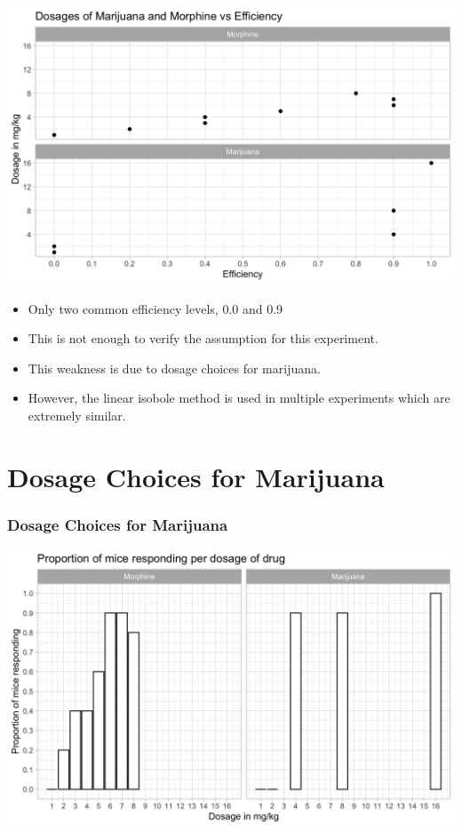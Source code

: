 \documentclass[14pt]{beamer}
\begin{document}
\begin{frame}
\includegraphics[scale=0.22]{dos_vs_eff.png}
\end{frame}

\begin{frame}
\begin{itemize}[label={$\blacktriangleright$}]
\item Only two common efficiency levels, 0.0 and 0.9
\item This is not enough to verify the assumption for this experiment.
\item This weakness is due to dosage choices for marijuana.
\item However, the linear isobole method is used in multiple experiments which are extremely similar.
\end{itemize}
\end{frame}

\section{Dosage Choices for Marijuana}

\begin{frame}
\frametitle{Dosage Choices for Marijuana}
\includegraphics[scale=0.22]{prop_bar.png}
\end{frame}
\end{document}
